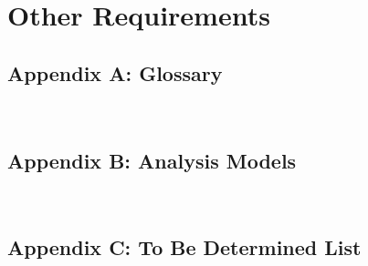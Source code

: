 \documentclass{report}
\begin{document}
\chapter{Other Requirements}

\section{Appendix A: Glossary} ~~~

\section{Appendix B: Analysis Models} ~~~

\section{Appendix C: To Be Determined List} ~~~
\end{document}
